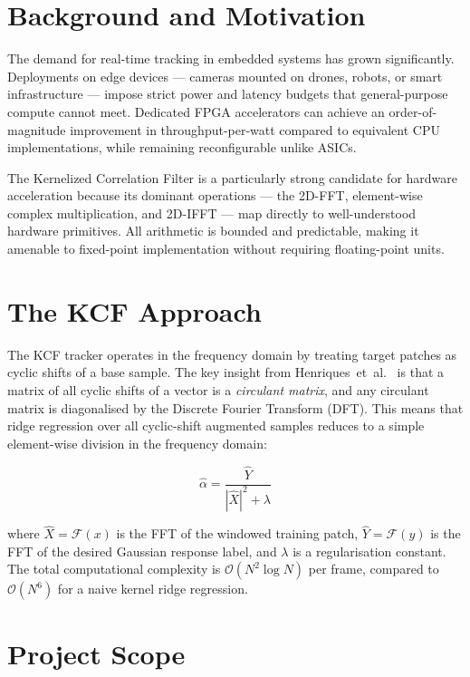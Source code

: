 \documentclass[a4paper,12pt]{report}
\begin{document}
\section{Background and Motivation}

The demand for real-time tracking in embedded systems has grown significantly. Deployments on edge devices — cameras mounted on drones, robots, or smart infrastructure — impose strict power and latency budgets that general-purpose compute cannot meet. Dedicated FPGA accelerators can achieve an order-of-magnitude improvement in throughput-per-watt compared to equivalent CPU implementations, while remaining reconfigurable unlike ASICs.

\par The Kernelized Correlation Filter \cite{henriques2015} is a particularly strong candidate for hardware acceleration because its dominant operations — the 2D-FFT, element-wise complex multiplication, and 2D-IFFT — map directly to well-understood hardware primitives. All arithmetic is bounded and predictable, making it amenable to fixed-point implementation without requiring floating-point units.

\section{The KCF Approach}

The KCF tracker operates in the frequency domain by treating target patches as cyclic shifts of a base sample. The key insight from Henriques~et~al.\ \cite{henriques2015} is that a matrix of all cyclic shifts of a vector is a \emph{circulant matrix}, and any circulant matrix is diagonalised by the Discrete Fourier Transform (DFT). This means that ridge regression over all cyclic-shift augmented samples reduces to a simple element-wise division in the frequency domain:

\begin{equation}\label{eq:train}
\hat{\alpha} = \frac{\hat{Y}}{|\hat{X}|^2 + \lambda}
\end{equation}

\noindent where $\hat{X} = \mathcal{F}(x)$ is the FFT of the windowed training patch, $\hat{Y} = \mathcal{F}(y)$ is the FFT of the desired Gaussian response label, and $\lambda$ is a regularisation constant. The total computational complexity is $\mathcal{O}(N^2 \log N)$ per frame, compared to $\mathcal{O}(N^6)$ for a naive kernel ridge regression.

\section{Project Scope}
\end{document}
